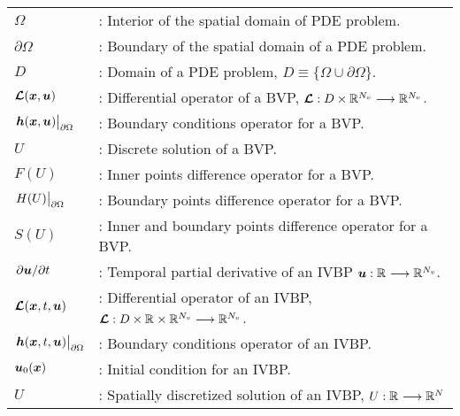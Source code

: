 \begin{tabular}{ll}	
	
	
	 $\Omega$ & :  Interior of the spatial domain of PDE problem.\\
	
	 $\partial\Omega$ & :  Boundary of the spatial domain of a PDE problem. \\
	
	 $D$ & :  Domain of a PDE problem, $D\equiv \{\Omega\cup \partial\Omega\}$.\\


     $\boldsymbol{\mathcal{L}}(\boldsymbol{x},\boldsymbol{u})$ & :  Differential operator of a BVP,    
     $\boldsymbol{\mathcal{L}} : D\times \mathbb{R}^{N_v} \longrightarrow \mathbb{R}^{N_v}$.\\
    
     $\eval{\vect{h}(\vect{x},\vect{u})}_{\partial\Omega}$ & :  Boundary conditions operator for a BVP.\\
  
    
     $U$ & :  Discrete solution of a BVP.\\
    
     $F(U)$ & :  Inner points difference operator for a BVP.\\
    
     $\eval{H(U)}_{\partial\Omega}$ & :  Boundary points difference operator for a BVP.\\
    
     $S(U)$ & :  Inner and boundary points difference operator for a BVP.\\
    
     $\pdv*{\boldsymbol{u}}{t}$ & :  Temporal partial derivative of an IVBP 
     $\boldsymbol{u} : \mathbb{R}^{} \longrightarrow \mathbb{R}^{N_v}$.\\
    
     $\boldsymbol{\mathcal{L}}(\boldsymbol{x},t,\boldsymbol{u})$ & :  Differential operator of an IVBP,  
     $\boldsymbol{\mathcal{L}} : D\times\mathbb{R}^{}\times \mathbb{R}^{N_v}  \longrightarrow \mathbb{R}^{N_v}$.\\
    
 
     $\eval{\vect{h}(\vect{x},t,\vect{u})}_{\partial\Omega}$ & :  Boundary conditions operator of an IVBP.\\
     
      $\boldsymbol{u}_0(\boldsymbol{x})$ & :  Initial condition for an IVBP.\\
     
      $U$ & :  Spatially discretized solution of an IVBP, $U : \mathbb{R}^{} \longrightarrow \mathbb{R}^{N}$\\
     

\end{tabular}
